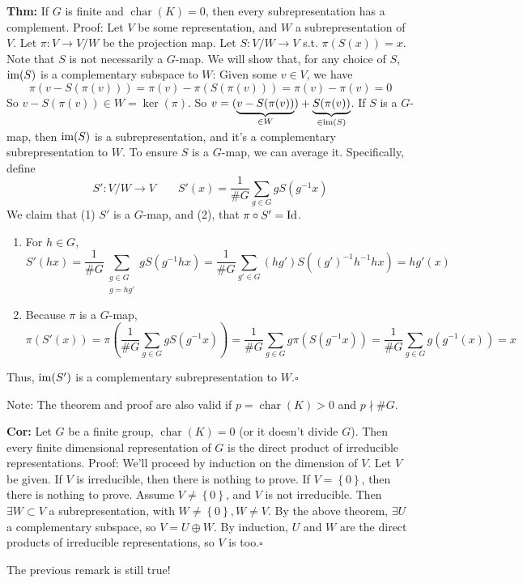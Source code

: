 \documentclass[10pt,letterpaper]{article}
\newcommand{\n}{\hfill\break}
\newcommand{\up}{\vspace{-\baselineskip}}
\newcommand{\hangblock}[2]{\par\noindent\settowidth{\hangindent}{\textbf{#1: }}\textbf{#1: }\!\!\!#2}
\newcommand{\thm}[1]{\hangblock{Thm}{#1}}
\newcommand{\cor}[1]{\hangblock{Cor}{#1}}
\newcommand{\proven}{\;$\square$\n}
\newcommand{\set}[1]{\left\{#1\right\}}
\newcommand{\inv}{^{-1}}
\newcommand{\of}{\circ}
\newcommand{\Id}{\textrm{\textnormal{Id}}}
\newcommand{\im}{\textrm{\textnormal{im}}}
\DeclareMathOperator{\fchar}{char}
\newcommand{\st}{s.t.}
\newcommand{\paren}[1]{\left(#1\right)}
\begin{document}
\thm{
	If $G$ is finite and $\fchar(K)=0$, then every subrepresentation has a complement.\n
	Proof: Let $V$ be some representation, and $W$ a subrepresentation of $V$. Let $\pi:V\to{}V/W$ be the projection map. Let $S:V/W\to{}V$ \st{} $\pi(S(x))=x$. Note that $S$ is not necessarily a $G$-map.\n
	We will show that, for any choice of $S$, $\im(S)$ is a complementary subspace to $W$: Given some $v\in{}V$, we have
	\[
		\pi(v-S(\pi(v)))=\pi(v)-\pi(S(\pi(v)))=\pi(v)-\pi(v)=0
	\]
	So $v-S(\pi(v))\in{}W=\ker(\pi)$. So $v=(\underbrace{v-S(\pi(v))}_{\in{}W})+\underbrace{S(\pi(v))}_{\in\im(S)}$.\n
	If $S$ is a $G$-map, then $\im(S)$ is a subrepresentation, and it's a complementary subrepresentation to $W$. To ensure $S$ is a $G$-map, we can average it. Specifically, define
	\[
		S':V/W\to{}V\qquad{}S'(x)=\frac{1}{\#G}\sum_{g\in{}G}gS(g\inv{}x)
	\]
	We claim that (1) $S'$ is a $G$-map, and (2), that $\pi\of{}S'=\Id$.
	\begin{enumerate}[topsep=0pt,leftmargin=4\parindent,label=(\arabic*)]
		\item For $h\in{}G$,
		\[
			S'(hx)=\frac{1}{\#G}\sum_{\substack{g\in{}G\\ g=hg'}}gS(g\inv{}hx)=\frac{1}{\#G}\sum_{g'\in{}G}(hg')S((g')\inv{}h\inv{}hx)=hg'(x)
		\]
		\item Because $\pi$ is a $G$-map,
		\[
			\pi(S'(x))=\pi\paren{\frac{1}{\#G}\sum_{g\in{}G}gS(g\inv{}x)}=\frac{1}{\#G}\sum_{g\in{}G}g\pi(S(g\inv{}x))=\frac{1}{\#G}\sum_{g\in{}G}g(g\inv(x))=x
		\]
	\end{enumerate}\up\n
	Thus, $\im(S')$ is a complementary subrepresentation to $W$.\proven
}

\par\noindent
Note: The theorem and proof are also valid if $p=\fchar(K)>0$ and $p\nmid\#{}G$.\n

\cor{
	Let $G$ be a finite group, $\fchar(K)=0$ (or it doesn't divide $G$). Then every finite dimensional representation of $G$ is the direct product of irreducible representations.\n
	Proof: We'll proceed by induction on the dimension of $V$. Let $V$ be given. If $V$ is irreducible, then there is nothing to prove. If $V=\set{0}$, then there is nothing to prove.\n
	Assume $V\ne\set{0}$, and $V$ is not irreducible. Then $\exists{}W\subset{}V$ a subrepresentation, with $W\ne\set{0},W\ne{}V$. By the above theorem, $\exists{}U$ a complementary subspace, so $V=U\oplus{}W$. By induction, $U$ and $W$ are the direct products of irreducible representations, so $V$ is too.\proven
}

\par\noindent
The previous remark is still true!\n
\end{document}
